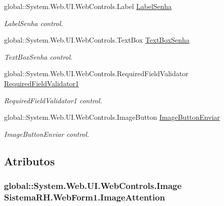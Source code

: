 \begin{DoxyCompactItemize}
global::System.Web.UI.WebControls.Label \hyperlink{class_sistema_r_h_1_1_web_form1_af8a14b0d5f77d4865f02acc042bd3b51}{LabelSenha}
\begin{DoxyCompactList}\small\item\em LabelSenha control. \item\end{DoxyCompactList}\item 
global::System.Web.UI.WebControls.TextBox \hyperlink{class_sistema_r_h_1_1_web_form1_ae9a568e1d9fadb99f0488fa437fa75c3}{TextBoxSenha}
\begin{DoxyCompactList}\small\item\em TextBoxSenha control. \item\end{DoxyCompactList}\item 
global::System.Web.UI.WebControls.RequiredFieldValidator \hyperlink{class_sistema_r_h_1_1_web_form1_a47c7703d71ff9afbabeed0c9336f9c08}{RequiredFieldValidator1}
\begin{DoxyCompactList}\small\item\em RequiredFieldValidator1 control. \item\end{DoxyCompactList}\item 
global::System.Web.UI.WebControls.ImageButton \hyperlink{class_sistema_r_h_1_1_web_form1_a00770412a46682d47cf488aa32da22d2}{ImageButtonEnviar}
\begin{DoxyCompactList}\small\item\em ImageButtonEnviar control. \item\end{DoxyCompactList}\end{DoxyCompactItemize}


\subsection{Atributos}
\hypertarget{class_sistema_r_h_1_1_web_form1_a07003e3d30b663797ab5e01f2154627c}{
\subsubsection[{ImageAttention}]{\setlength{\rightskip}{0pt plus 5cm}global::System.Web.UI.WebControls.Image {\bf SistemaRH.WebForm1.ImageAttention}}}
\label{class_sistema_r_h_1_1_web_form1_a07003e3d30b663797ab5e01f2154627c}


